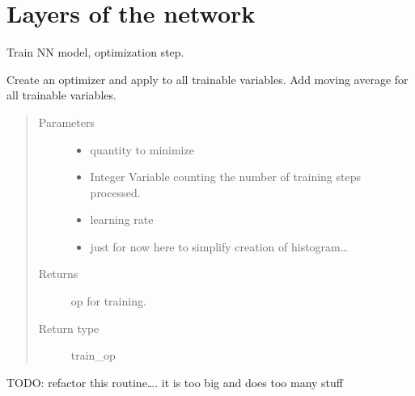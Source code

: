 \documentclass[letterpaper,10pt,english]{sphinxmanual}
\begin{document}
\chapter{Layers of the network}
\label{\detokenize{neuralnet/train_ops:module-train_ops}}\label{\detokenize{neuralnet/train_ops:layers-of-the-network}}\label{\detokenize{neuralnet/train_ops::doc}}

\begin{fulllineitems}
\label{\detokenize{neuralnet/train_ops:train_ops.train_NN}}
Train NN model, optimization step.

Create an optimizer and apply to all trainable variables. Add moving
average for all trainable variables.
\begin{quote}\begin{description}
\item[{Parameters}] \leavevmode\begin{itemize}
\item {} 
 \textendash{} quantity to minimize

\item {} 
 \textendash{} Integer Variable counting the number of training steps
processed.

\item {} 
 \textendash{} learning rate

\item {} 
 \textendash{} just for now here to simplify creation of histogram…

\end{itemize}

\item[{Returns}] \leavevmode
op for training.

\item[{Return type}] \leavevmode
train\_op

\end{description}\end{quote}

TODO: refactor this routine…. it is too big and does too many stuff

\end{fulllineitems}
\end{document}
